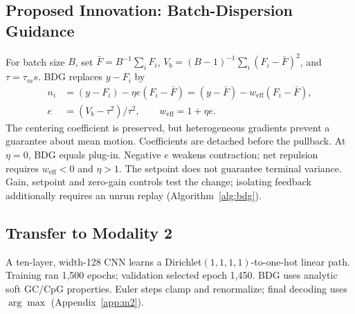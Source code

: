 \documentclass{article}
\newcommand{\Fbar}{\bar F}
\newcommand{\Vb}{V_b}
\newcommand{\weff}{w_{\mathrm{eff}}}
\begin{document}
\subsection{Proposed Innovation: Batch-Dispersion Guidance}\label{sec:bdg}
For batch size $B$, set $\Fbar=B^{-1}\sum_iF_i$, $\Vb=(B-1)^{-1}\sum_i(F_i-\Fbar)^2$, and $\tau=\tau_m s$. BDG replaces $y-F_i$ by
\begin{equation}
\begin{aligned}
n_i&=(y-F_i)-\eta e(F_i-\Fbar)=(y-\Fbar)-\weff(F_i-\Fbar),\\
e&=(\Vb-\tau^2)/\tau^2,\qquad \weff=1+\eta e.
\end{aligned}\label{eq:bdg}
\end{equation}
The centering coefficient is preserved, but heterogeneous gradients prevent a guarantee about mean motion. Coefficients are detached before the pullback. At $\eta=0$, BDG equals plug-in. Negative $e$ weakens contraction; net repulsion requires $\weff<0$ and $\eta>1$. The setpoint does not guarantee terminal variance. Gain, setpoint and zero-gain controls test the change; isolating feedback additionally requires an unrun replay (Algorithm~\ref{alg:bdg}).

\subsection{Transfer to Modality 2}\label{sec:transfer}
A ten-layer, width-128 CNN learns a Dirichlet$(1,1,1,1)$-to-one-hot linear path. Training ran 1,500 epochs; validation selected epoch 1,450. BDG uses analytic soft GC/CpG properties. Euler steps clamp and renormalize; final decoding uses $\arg\max$ (Appendix~\ref{app:m2}).
\end{document}
